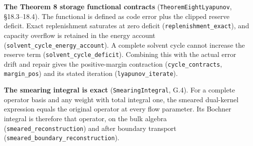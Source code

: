 \documentclass[
]{article}
\begin{document}
\textbf{The Theorem 8 storage functional contracts}
(\texttt{T\allowbreak{}h\allowbreak{}e\allowbreak{}o\allowbreak{}r\allowbreak{}e\allowbreak{}m\allowbreak{}E\allowbreak{}i\allowbreak{}g\allowbreak{}h\allowbreak{}t\allowbreak{}L\allowbreak{}y\allowbreak{}a\allowbreak{}p\allowbreak{}u\allowbreak{}n\allowbreak{}o\allowbreak{}v},
§18.3--18.4). The functional is defined as code error plus the clipped
reserve deficit. Exact replenishment saturates at zero deficit
(\texttt{r\allowbreak{}e\allowbreak{}p\allowbreak{}l\allowbreak{}e\allowbreak{}n\allowbreak{}i\allowbreak{}s\allowbreak{}h\allowbreak{}m\allowbreak{}e\allowbreak{}n\allowbreak{}t\allowbreak{}\_\allowbreak{}e\allowbreak{}x\allowbreak{}a\allowbreak{}c\allowbreak{}t}),
and capacity overflow is retained in the energy account
(\texttt{s\allowbreak{}o\allowbreak{}l\allowbreak{}v\allowbreak{}e\allowbreak{}n\allowbreak{}t\allowbreak{}\_\allowbreak{}c\allowbreak{}y\allowbreak{}c\allowbreak{}l\allowbreak{}e\allowbreak{}\_\allowbreak{}e\allowbreak{}n\allowbreak{}e\allowbreak{}r\allowbreak{}g\allowbreak{}y\allowbreak{}\_\allowbreak{}a\allowbreak{}c\allowbreak{}c\allowbreak{}o\allowbreak{}u\allowbreak{}n\allowbreak{}t}).
A complete solvent cycle cannot increase the reserve term
(\texttt{s\allowbreak{}o\allowbreak{}l\allowbreak{}v\allowbreak{}e\allowbreak{}n\allowbreak{}t\allowbreak{}\_\allowbreak{}c\allowbreak{}y\allowbreak{}c\allowbreak{}l\allowbreak{}e\allowbreak{}\_\allowbreak{}d\allowbreak{}e\allowbreak{}f\allowbreak{}i\allowbreak{}c\allowbreak{}i\allowbreak{}t}).
Combining this with the actual error drift and repair gives the
positive-margin contraction (\texttt{cycle\_contracts},
\texttt{margin\_pos}) and its stated iteration
(\texttt{lyapunov\_iterate}).

\textbf{The smearing integral is exact} (\texttt{SmearingIntegral},
G.4). For a complete operator basis and any weight with total integral
one, the smeared dual-kernel expression equals the original operator at
every flow parameter. Its Bochner integral is therefore that operator,
on the bulk algebra
(\texttt{s\allowbreak{}m\allowbreak{}e\allowbreak{}a\allowbreak{}r\allowbreak{}e\allowbreak{}d\allowbreak{}\_\allowbreak{}r\allowbreak{}e\allowbreak{}c\allowbreak{}o\allowbreak{}n\allowbreak{}s\allowbreak{}t\allowbreak{}r\allowbreak{}u\allowbreak{}c\allowbreak{}t\allowbreak{}i\allowbreak{}o\allowbreak{}n})
and after boundary transport
(\texttt{s\allowbreak{}m\allowbreak{}e\allowbreak{}a\allowbreak{}r\allowbreak{}e\allowbreak{}d\allowbreak{}\_\allowbreak{}b\allowbreak{}o\allowbreak{}u\allowbreak{}n\allowbreak{}d\allowbreak{}a\allowbreak{}r\allowbreak{}y\allowbreak{}\_\allowbreak{}r\allowbreak{}e\allowbreak{}c\allowbreak{}o\allowbreak{}n\allowbreak{}s\allowbreak{}t\allowbreak{}r\allowbreak{}u\allowbreak{}c\allowbreak{}t\allowbreak{}i\allowbreak{}o\allowbreak{}n}).
\end{document}
